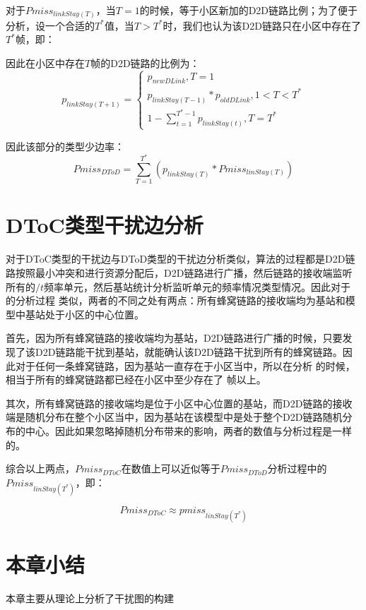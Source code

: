 \documentclass[figurelist,tablelist,algorithmlist,nomlist,masters]{seuthesix}
\begin{document}
	对于$Pmis{s_{linkStay(T)}}$，当$T=1$的时候，等于小区新加的D2D链路比例；为了便于分析，设一个合适的$T^*$值，当$T > T^*$时，我们也认为该D2D链路只在小区中存在了$T^*$帧，即：
	
	因此在小区中存在$T$帧的D2D链路的比例为：
	\begin{equation}\label{eq3.1}
	{p_{linkStay(T + 1)}} = \left\{ \begin{array}{l}
	{p_{newDLink}},T = 1\\
	{p_{linkStay(T - 1)}}*{p_{oldDLink}},1 < T < T^* \\
	1 - \sum\limits_{t = 1}^{{T^*} - 1} {{p_{linkStay(t)}}} ,T = T^*
	\end{array} \right.
	\end{equation}
	
	因此该部分的类型少边率：
	\begin{equation}\label{eq3.1}
	Pmis{s_{DToD}} = \sum\limits_{T = 1}^{{T^*}} {({p_{linkStay(T)}}*Pmis{s_{linStay(T)}})}
	\end{equation}
	
	
	\section{DToC类型干扰边分析}
	对于DToC类型的干扰边与DToD类型的干扰边分析类似，算法的过程都是D2D链路按照最小冲突和进行资源分配后，D2D链路进行广播，然后链路的接收端监听所有的$/t$频率单元，然后基站统计分析监听单元的频率情况类型情况。因此对于 的分析过程 类似，两者的不同之处有两点：所有蜂窝链路的接收端均为基站和模型中基站处于小区的中心位置。
	
	首先，因为所有蜂窝链路的接收端均为基站，D2D链路进行广播的时候，只要发现了该D2D链路能干扰到基站，就能确认该D2D链路干扰到所有的蜂窝链路。因此对于任何一条蜂窝链路，因为基站一直存在于小区当中，所以在分析 的时候，相当于所有的蜂窝链路都已经在小区中至少存在了 帧以上。
	
	其次，所有蜂窝链路的接收端均是位于小区中心位置的基站，而D2D链路的接收端是随机分布在整个小区当中，因为基站在该模型中是处于整个D2D链路随机分布的中心。因此如果忽略掉随机分布带来的影响，两者的数值与分析过程是一样的。
	
	综合以上两点，$Pmis{s_{DToC}}$在数值上可以近似等于$Pmis{s_{DToD}}$分析过程中的$Pmis{s_{linStay({T^*})}}$，即：
	
	\begin{equation}\label{eq3.1}
	Pmis{s_{DToC}} \approx pmis{s_{linStay({T^*})}}
	\end{equation}
	
	\section{本章小结}
	本章主要从理论上分析了干扰图的构建
	
\end{document}
